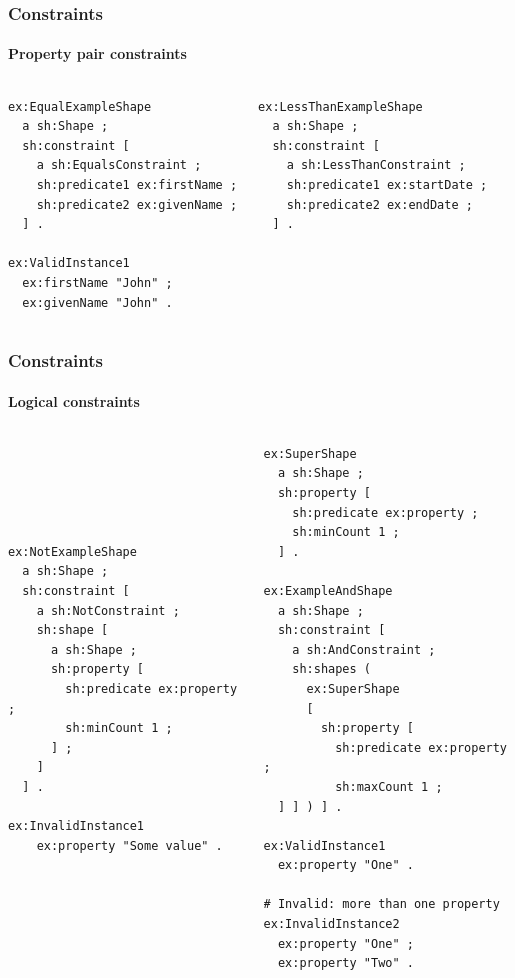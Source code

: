 \documentclass{beamer}
\begin{document}
\begin{frame}[fragile]
  \frametitle{Constraints}
  \framesubtitle{Property pair constraints}

  \begin{columns}[t]

    \begin{Verbatim}[fontsize=\footnotesize]
ex:EqualExampleShape
  a sh:Shape ;
  sh:constraint [
    a sh:EqualsConstraint ;
    sh:predicate1 ex:firstName ;
    sh:predicate2 ex:givenName ;
  ] .

ex:ValidInstance1
  ex:firstName "John" ;
  ex:givenName "John" .
    \end{Verbatim}


    \begin{Verbatim}[fontsize=\footnotesize]
ex:LessThanExampleShape
  a sh:Shape ;
  sh:constraint [
    a sh:LessThanConstraint ;
    sh:predicate1 ex:startDate ;
    sh:predicate2 ex:endDate ;
  ] .
    \end{Verbatim}
  \end{columns}
\end{frame}

\begin{frame}[fragile]
  \frametitle{Constraints}
  \framesubtitle{Logical constraints}

  \vspace{-2cm}

  \begin{columns}[t]

    \begin{Verbatim}[fontsize=\scriptsize]





ex:NotExampleShape
  a sh:Shape ;
  sh:constraint [
    a sh:NotConstraint ;
    sh:shape [
      a sh:Shape ;
      sh:property [
        sh:predicate ex:property ;
        sh:minCount 1 ;
      ] ;
    ]
  ] .

ex:InvalidInstance1
    ex:property "Some value" .
    \end{Verbatim}


    \begin{Verbatim}[fontsize=\scriptsize]
ex:SuperShape
  a sh:Shape ;
  sh:property [
    sh:predicate ex:property ;
    sh:minCount 1 ;
  ] .

ex:ExampleAndShape
  a sh:Shape ;
  sh:constraint [
    a sh:AndConstraint ;
    sh:shapes (
      ex:SuperShape
      [
        sh:property [
          sh:predicate ex:property ;
          sh:maxCount 1 ;
  ] ] ) ] .

ex:ValidInstance1
  ex:property "One" .

# Invalid: more than one property
ex:InvalidInstance2
  ex:property "One" ;
  ex:property "Two" .
    \end{Verbatim}
  \end{columns}
\end{frame}
\end{document}
